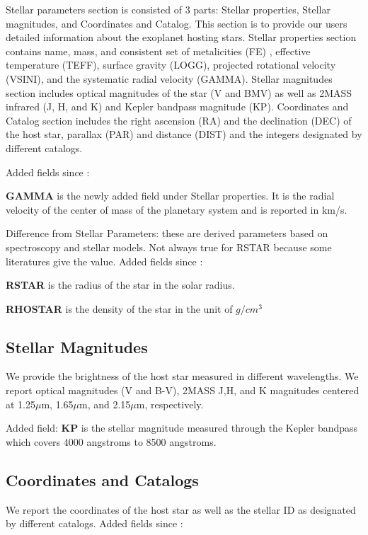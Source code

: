 \documentclass[11pt,preprint]{aastex}
\def\micron{$\mu$m}
\def\micron{$\mu$m}
\begin{document}
\begin{CJK*}{UTF8}{gbsn}
Stellar parameters section is consisted of 3 parts: Stellar properties, Stellar magnitudes, and Coordinates and Catalog. This section is to provide our users detailed information about the exoplanet hosting stars. Stellar properties section contains name, mass, and consistent set of metalicities (FE) , effective temperature (TEFF), surface gravity (LOGG), projected rotational velocity (VSINI), and the systematic radial velocity (GAMMA). Stellar magnitudes section includes optical magnitudes of the star (V and BMV) as well as 2MASS infrared (J, H, and K) and Kepler bandpass magnitude (KP). Coordinates and Catalog section includes the right ascension (RA) and the declination (DEC) of the host star, parallax (PAR) and distance (DIST) and the integers designated by different catalogs. 

Added fields since \cite{Wright2011}:


{\bf GAMMA} is the newly added field under Stellar properties. It is the radial velocity of the center of mass of the planetary system and is reported in km/s.  


Difference from Stellar Parameters: these are derived parameters based
on spectroscopy and stellar models. 
Not always true for RSTAR because some literatures give the value. 
Added fields since \cite{Wright2011}:

{\bf RSTAR} is the radius of the star in the solar radius. 

{\bf RHOSTAR} is the density of the star in the unit of $g/cm^3$

\subsection {Stellar Magnitudes}

We provide the brightness of the host star measured in different wavelengths. We report optical magnitudes (V and B-V), 2MASS J,H, and K magnitudes centered at 1.25\micron, 1.65\micron, and 2.15\micron, respectively. 

Added field: 
{\bf KP} is the stellar magnitude measured through the Kepler bandpass which covers 4000 angstroms to 8500 angstroms. 

\subsection{Coordinates and Catalogs}
We report the coordinates of the host star as well as the stellar ID as designated by different catalogs. 
Added fields since \cite{Wright2011}:


\end{CJK*}
\end{document}
